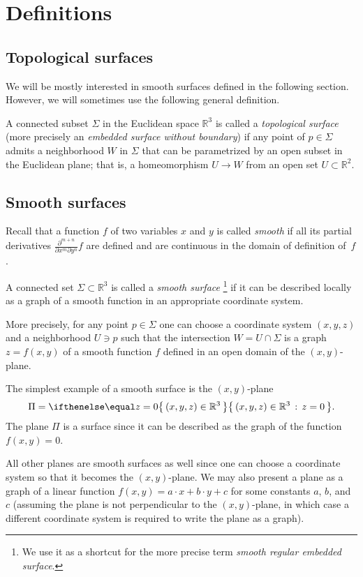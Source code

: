 \chapter{Definitions}
\label{chap:surfaces-def}
\section{Topological surfaces}

We will be mostly interested in smooth surfaces defined in the following section.
However, we will sometimes use the following general definition.

A connected subset $\Sigma$ in the Euclidean space $\mathbb{R}^3$
is called a \emph{topological surface} (more precisely an {}\emph{embedded surface without boundary}) 
if any point of $p\in \Sigma$ admits a neighborhood $W$ in $\Sigma$ 
that can be parametrized by an open subset in the Euclidean plane; 
that is, a homeomorphism $U\to W$ from an open set $U\subset \mathbb{R}^2$.


\section{Smooth surfaces}\label{sec:def-smooth-surface}

Recall that a function $f$ of two variables $x$ and $y$ is called \emph{smooth} if all its partial derivatives $\frac{\partial^{m+n}}{\partial x^m\partial y^n}f$ are defined and are continuous in the domain of definition of~$f$. 

A connected set $\Sigma \subset \mathbb{R}^3$ is called a \emph{smooth surface}%
\footnote{We use it as a shortcut for the more precise term {}\emph{smooth regular embedded surface}.} if it can be described locally as a graph of a smooth function in an appropriate coordinate system.

More precisely, for any point $p\in \Sigma$ one can choose a coordinate system $(x,y,z)$ and a neighborhood $U\ni p$ such that
the intersection $W=U\cap \Sigma$ is a graph $z=f(x,y)$ of a smooth function $f$ defined in an open domain of the $(x,y)$-plane.

The simplest example of a smooth surface is the $(x,y)$-plane 
\[\Pi=\set{(x,y,z)\in\mathbb{R}^3}{z=0}.\]
The plane $\Pi$ is a surface since
it can be described as the graph of the function $f(x,y)=0$.

All other planes are smooth surfaces as well since one can choose a coordinate system so that it becomes the $(x,y)$-plane.
We may also present a plane as a graph of a linear function 
$f(x,y)=a\cdot x+b\cdot y+c$ for some constants $a$, $b$, and $c$
(assuming the plane is not perpendicular to the $(x,y)$-plane, in which case a different coordinate system is required to write the plane as a graph).

